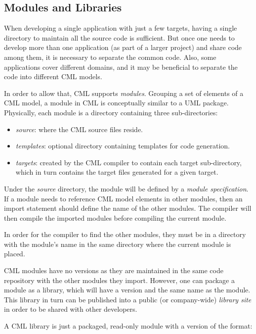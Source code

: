 \subsection{Modules and Libraries}\label{subsec:modlib}

When developing a single application with just a few targets, having a single directory to maintain all the source code is sufficient. But once one needs to develop more than one application (as part of a larger project) and share code among them, it is necessary to separate the common code. Also, some applications cover different domains, and it may be beneficial to separate the code into different CML models.

In order to allow that, CML supports \emph{modules}. Grouping a set of elements of a CML model, a module in CML is conceptually similar to a UML \cite{uml} package. Physically, each module is a directory containing three sub-directories:

\begin{itemize}
\item \emph{source}: where the CML source files reside.
\item \emph{templates}: optional directory containing templates for code generation.
\item \emph{targets}: created by the CML compiler to contain each target sub-directory, which in turn contains the target files generated for a given target.
\end{itemize}

Under the \emph{source} directory, the module will be defined by a \emph{module specification}. If a module needs to reference CML model elements in other modules, then an import statement should define the name of the other modules. The compiler will then compile the imported modules before compiling the current module.

In order for the compiler to find the other modules, they must be in a directory with the module's name in the same directory where the current module is placed.

CML modules have no versions as they are maintained in the same code repository with the other modules they import. However, one can package a module as a library, which will have a version and the same name as the module. This library in turn can be published into a public (or company-wide) \emph{library site} in order to be shared with other developers.

A CML library is just a packaged, read-only module with a version of the format: 


